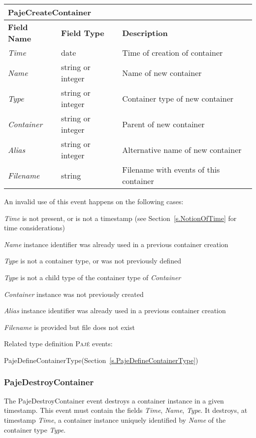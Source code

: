 \documentclass[12pt]{article}
\newcommand{\Paje}{\textsc{Paj\'e}\xspace}
\newcommand{\PajeField}[1]{\emph{#1}\xspace}
\newcommand{\Time}{\PajeField{Time}}
\newcommand{\Name}{\PajeField{Name}}
\newcommand{\Type}{\PajeField{Type}}
\newcommand{\Container}{\PajeField{Container}}
\newcommand{\Alias}{\PajeField{Alias}}
\newcommand{\Filename}{\PajeField{Filename}}
\newcommand{\PajeEvent}[1]{\textsf{#1}\xspace}
\newcommand{\PajeDefineContainerType}{\PajeEvent{PajeDefineContainerType}}
\newcommand{\PajeCreateContainer}{\PajeEvent{PajeCreateContainer}}
\newcommand{\PajeDestroyContainer}{\PajeEvent{PajeDestroyContainer}}
\newenvironment{itemize*}%
               {\vspace{-1em}
                 \begin{itemize}%
                   \setlength{\itemsep}{0pt}%
                   \setlength{\parskip}{0pt}}%
               {\end{itemize}}
\begin{document}
\begin{tabular}{|LLL|}
\hline
\multicolumn{3}{|T|}{\textbf{\PajeCreateContainer}}\\\hline
\textbf{Field Name} & \textbf{Field Type} & \textbf{Description}\\\hline
\Time          & date              & Time of creation of container \\
\Name          & string or integer & Name of new container \\
\Type          & string or integer & Container type of new container \\
\Container     & string or integer & Parent of new container \\\hline
\Alias         & string or integer & Alternative name of new container \\
\Filename      & string            &  Filename with events of this container \\
\hline
\end{tabular}

An invalid use of this event happens on the following cases:
\begin{itemize*}
\item \Time is not present, or is not a timestamp (see Section~\ref{s.NotionOfTime} for time considerations)
\item \Name instance identifier was already used in a previous container creation
\item \Type is not a container type, or was not previously defined
\item \Type is not a child type of the container type of \Container
\item \Container instance was not previously created
\item \Alias instance identifier was already used in a previous container creation
\item \Filename is provided but file does not exist
\end{itemize*}

Related type definition \Paje events:
\begin{itemize*}
\item \PajeDefineContainerType (Section~\ref{s.PajeDefineContainerType})
\end{itemize*}

\subsubsection{PajeDestroyContainer}
\label{s.PajeDestroyContainer}
The \PajeDestroyContainer event destroys a container instance in a
given timestamp. This event must contain the fields \Time, \Name,
\Type. It destroys, at timestamp \Time, a container instance uniquely
identified by \Name of the container type \Type.
\end{document}
